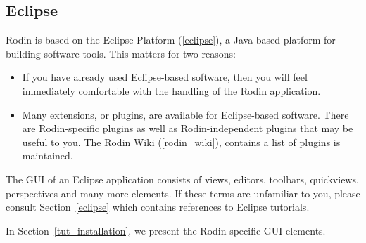 \subsection{Eclipse} 
\label{tut_eclipse}

Rodin is based on the Eclipse Platform (\ref{eclipse}), a Java-based platform for building software tools.  This matters for two reasons:
\begin{itemize}
	\item If you have already used Eclipse-based software, then you will feel immediately comfortable with the handling of the Rodin application.
	\item Many extensions, or plugins, are available for Eclipse-based software. There are Rodin-specific plugins as well as Rodin-independent plugins that may be useful to you.  The Rodin Wiki (\ref{rodin_wiki}), contains a list of plugins is maintained.
\end{itemize}

The GUI of an Eclipse application consists of views, editors, toolbars, quickviews, perspectives and many more elements.  If these terms are unfamiliar to you, please consult Section~\ref{eclipse} which contains references to Eclipse tutorials.

In Section~\ref{tut_installation}, we present the Rodin-specific GUI elements.
